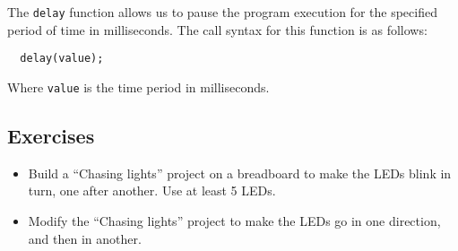 \documentclass[../sparc.tex]{subfiles}
\begin{document}
The \texttt{delay} function allows us to pause the program execution for the
specified period of time in milliseconds.  The call syntax for this function is
as follows:

\begin{verbatim}
  delay(value);
\end{verbatim}

Where \texttt{value} is the time period in milliseconds.

\subsection{Exercises}
\begin{itemize}
\item Build a ``Chasing lights'' project on a breadboard to make the LEDs blink
  in turn, one after another.  Use at least 5 LEDs.
\item Modify the ``Chasing lights'' project to make the LEDs go in one
  direction, and then in another.
\end{itemize}
\end{document}
